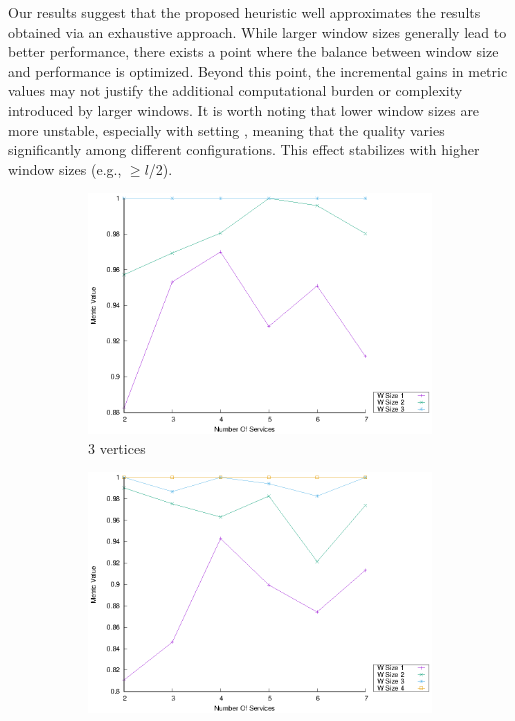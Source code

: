Our results suggest that the proposed heuristic well approximates the results obtained via an exhaustive approach. While larger window sizes generally lead to better performance, there exists a point where the balance between window size and performance is optimized. Beyond this point, the incremental gains in metric values may not justify the additional computational burden or complexity introduced by larger windows. It is worth noting that lower window sizes are more unstable, especially with setting \wide, meaning that the quality varies significantly among different configurations. This effect stabilizes with higher window sizes (e.g., \windowsize$\geq$$l$/2).

\begin{figure}[!htb]
  \centering
  \begin{subfigure}{0.33\textwidth}
    \includegraphics[width=\textwidth]{Images/graphs/window_quality_performance_diff_perce_n7_s7_20_100_n3}
    \caption{3 vertices}
    \label{fig:quality_window_perce_wide_3n}
  \end{subfigure}
  \hfill
  \begin{subfigure}{0.33\textwidth}
    \includegraphics[width=\textwidth]{Images/graphs/window_quality_performance_diff_perce_n7_s7_20_100_n4}

\end{subfigure}
\end{figure}
